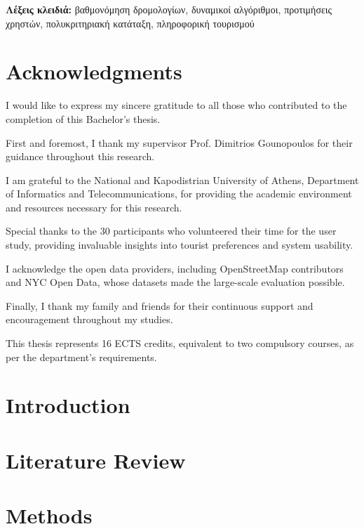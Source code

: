 \documentclass[12pt,a4paper,twoside]{report}
\theoremstyle{definition}
\begin{document}
\textbf{Λέξεις κλειδιά:} βαθμονόμηση δρομολογίων, δυναμικοί αλγόριθμοι, προτιμήσεις χρηστών, πολυκριτηριακή κατάταξη, πληροφορική τουρισμού


\chapter*{Acknowledgments}

I would like to express my sincere gratitude to all those who contributed to the completion of this Bachelor's thesis.

First and foremost, I thank my supervisor Prof. Dimitrios Gounopoulos for their guidance throughout this research.

I am grateful to the National and Kapodistrian University of Athens, Department of Informatics and Telecommunications, for providing the academic environment and resources necessary for this research.

Special thanks to the 30 participants who volunteered their time for the user study, providing invaluable insights into tourist preferences and system usability.

I acknowledge the open data providers, including OpenStreetMap contributors and NYC Open Data, whose datasets made the large-scale evaluation possible.

Finally, I thank my family and friends for their continuous support and encouragement throughout my studies.

This thesis represents 16 ECTS credits, equivalent to two compulsory courses, as per the department's requirements.

\tableofcontents
\listoffigures
\listoftables
\listofalgorithms

\chapter{Introduction}


\chapter{Literature Review}


\chapter{Methods}

\end{document}

